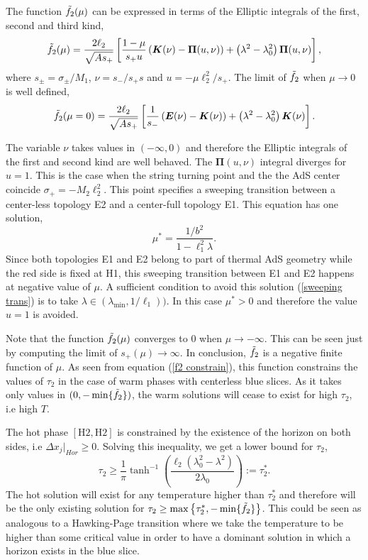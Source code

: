 The function $\Tilde{f}_2(\mu)$ can be expressed in terms of the Elliptic integrals of the first, second and third kind,
\begin{equation}
    \Tilde{f}_2(\mu) = \frac{2\ell_2}{\sqrt{As_+}}\left[\frac{1-\mu}{s_+ u}\left(\bm{K}(\nu)-\bm{\Pi}(u,\nu)\right)+\left(\lambda^2-\lambda_0^2\right)\bm{\Pi}(u,\nu)\right],
\end{equation}
where $s_\pm=\sigma_\pm/M_1$, $\nu=s_-/s_+s$ and $u=-\mu\ell_2^2/s_+$. The limit of $\Tilde{f_2}$ when $\mu\rightarrow0$ is well defined,
\begin{equation}
    \Tilde{f}_2(\mu=0) = \frac{2\ell_2}{\sqrt{As_+}}\left[\frac{1}{s_-}\left(\bm{E}(\nu)-\bm{K}(\nu)\right)+\left(\lambda^2-\lambda_0^2\right)\bm{K}(\nu)\right].
\end{equation}

The variable $\nu$ takes values in $(-\infty,0)$ and therefore the Elliptic integrals of the first and second kind are well behaved. The $\bm{\Pi}(u,\nu)$ integral diverges for $u=1$. This is the case when the string turning point and the the AdS center coincide $\sigma_+ = -M_2\ell_2^2$. This point specifies a sweeping transition between a center-less topology E2 and a center-full topology E1. This equation has one solution,
\begin{equation}\label{sweeping trans}
    \mu^* = \frac{1/b^2}{1-\ell_1^2\lambda}.
\end{equation}
Since both topologies E1 and E2 belong to part of thermal AdS geometry while the red side is fixed at H1, this sweeping transition between E1 and E2 happens at negative value of $\mu$. A sufficient condition to avoid this solution (\ref{sweeping trans}) is to take $\lambda\in(\lambda_\text{min},1/\ell_1))$. In this case $\mu^*>0$ and therefore the value $u=1$ is avoided.

Note that the function $\Tilde{f}_2(\mu)$ converges to 0 when $\mu\rightarrow-\infty$. This can be seen just by computing the limit of $s_+(\mu)\rightarrow\infty$. In conclusion, $\Tilde{f}_2$ is a negative finite function of $\mu$. As seen from equation (\ref{f2 constrain}), this function constrains the values of $\tau_2$ in the case of warm phases with centerless blue slices. As it takes only values in $(0,-\min\{\Tilde{f}_2\})$, the warm solutions will cease to exist for high $\tau_2$, i.e high $T$.

The hot phase $\left[\text{H}2,\text{H}2\right]$ is constrained by the existence of the horizon on both sides, i.e $\Delta x_j|_{Hor}\geq0$. Solving this inequality, we get a lower bound for $\tau_2$,
\begin{equation}
    \tau_2\geq\frac{1}{\pi}\tanh^{-1}\left(\frac{\ell_2(\lambda_0^2-\lambda^2)}{2\lambda_0}\right):=\tau_2^*.
\end{equation}
The hot solution will exist for any temperature higher than $\tau_2^*$ and therefore will be the only existing solution for $\tau_2\geq\max\left\{\tau_2^*,-\min\{\Tilde{f}_2\}\right\}$. This could be seen as analogous to a Hawking-Page transition where we take the temperature to be higher than some critical value in order to have a dominant solution in which a horizon exists in the blue slice.

